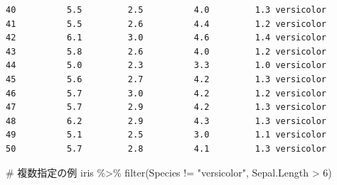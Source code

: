 \documentclass[
  a4paper,
]{ltjsbook}
\newenvironment{Shaded}{\begin{snugshade}}{\end{snugshade}}
\newcommand{\CommentTok}[1]{\textcolor[rgb]{0.37,0.37,0.37}{#1}}
\newcommand{\DecValTok}[1]{\textcolor[rgb]{0.68,0.00,0.00}{#1}}
\newcommand{\FunctionTok}[1]{\textcolor[rgb]{0.28,0.35,0.67}{#1}}
\newcommand{\NormalTok}[1]{\textcolor[rgb]{0.00,0.23,0.31}{#1}}
\newcommand{\SpecialCharTok}[1]{\textcolor[rgb]{0.37,0.37,0.37}{#1}}
\newcommand{\StringTok}[1]{\textcolor[rgb]{0.13,0.47,0.30}{#1}}
\begin{document}
\begin{verbatim}
40          5.5         2.5          4.0         1.3 versicolor
41          5.5         2.6          4.4         1.2 versicolor
42          6.1         3.0          4.6         1.4 versicolor
43          5.8         2.6          4.0         1.2 versicolor
44          5.0         2.3          3.3         1.0 versicolor
45          5.6         2.7          4.2         1.3 versicolor
46          5.7         3.0          4.2         1.2 versicolor
47          5.7         2.9          4.2         1.3 versicolor
48          6.2         2.9          4.3         1.3 versicolor
49          5.1         2.5          3.0         1.1 versicolor
50          5.7         2.8          4.1         1.3 versicolor
\end{verbatim}

\begin{Shaded}
\begin{Highlighting}[]
\CommentTok{\# 複数指定の例}
\NormalTok{iris }\SpecialCharTok{\%\textgreater{}\%} \FunctionTok{filter}\NormalTok{(Species }\SpecialCharTok{!=} \StringTok{"versicolor"}\NormalTok{, Sepal.Length }\SpecialCharTok{\textgreater{}} \DecValTok{6}\NormalTok{)}
\end{Highlighting}
\end{Shaded}
\end{document}
